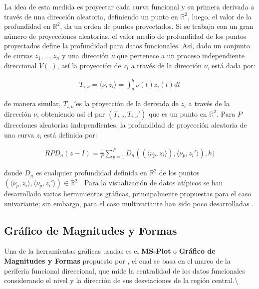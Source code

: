 \documentclass[
]{book}
\begin{document}
La idea de esta medida es proyectar cada curva funcional y su primera derivada a través de una dirección aleatoria, definiendo un punto en \(\mathbb{R}^2\), luego, el valor de la profundidad en \(\mathbb{R}^2\), da un orden de puntos proyectados. Si se trabaja con un gran número de proyecciones aleatorias, el valor medio de profundidad de los puntos proyectados define la profundidad para datos funcionales. Así, dado un conjunto de curvas \(z_1,...,z_n\) y una dirección \(\nu\) que pertenece a un proceso independiente direccional \(V(.)\), así la proyección de \(z_i\) a través de la dirección \(\nu\), está dada por:

\begin{align*}
    T_{i,\nu}=\langle \nu,z_i \rangle=\int_a^b \nu(t)z_i(t)dt
\end{align*}

de manera similar, \(T_{i,\nu}'\)es la proyección de la derivada de \(z_i\) a través de la dirección \(\nu\), obteniendo así el par \((T_{i,\nu},T_{i,\nu}')\) que es un punto en \(\mathbb{R}^2\). Para \(P\) direcciones aleatorias independientes, la profundidad de proyección aleatoria de una curva \(z_i\) está definida por:

\begin{align*}
    RPD_n(z-I)=\frac{1}{P}\sum_{p=1}^P D_n((\langle\nu_{p},z_i \rangle),\langle\nu_p, z_{i}'\rangle), h)
\end{align*}

donde \(D_n\) es cualquier profundidad definida en \(\mathbb{R}^2\) de los puntos \((\langle\nu_p,z_i \rangle,\langle\nu_p,z_i' \rangle) \in \mathbb{R}^2\) \citep{manuel}. Para la visualización de datos atípicos se han desarrollado varias herramientas gráficas, principalmente propuestas para el caso univariante; sin embargo, para el caso multivariante han sido poco desarrolladas \citep{dai}.

\hypertarget{gruxe1fico-de-magnitudes-y-formas}{%
\subsection{Gráfico de Magnitudes y Formas}\label{gruxe1fico-de-magnitudes-y-formas}}

Una de la herramientas gráficas usadas es el \textbf{MS-Plot} o \textbf{Gráfico de Magnitudes y Formas} propuesto por \citep{dai}, el cual se basa en el marco de la periferia funcional direccional, que mide la centralidad de los datos funcionales considerando el nivel y la dirección de sus desviaciones de la región central.\textbackslash{}
\end{document}
